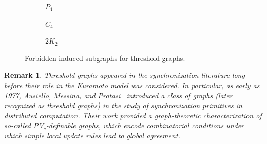 \documentclass[11pt,reqno]{amsart}
\newtheorem{remark}[theorem]{Remark}
\theoremstyle{definition}
\begin{document}
\begin{figure}[H]
  \centering

  \begin{subfigure}[b]{0.28\textwidth}
    \centering
    \caption{$P_4$}
  \end{subfigure}
  \hfill
  \begin{subfigure}[b]{0.28\textwidth}
    \centering
    \caption{$C_4$}
  \end{subfigure}
  \hfill
  \begin{subfigure}[b]{0.28\textwidth}
    \centering
    \caption{$2K_2$}
  \end{subfigure}
  \caption{Forbidden induced subgraphs for threshold graphs.}
  \label{fig:threshold-forbidden}
\end{figure}

\begin{remark}
Threshold graphs appeared in the synchronization literature long before their role in the Kuramoto model was considered. In particular, as early as 1977, Ausiello, Messina, and Protasi~\cite{Ausiello1977} introduced a class of graphs (later recognized as threshold graphs) in the study of synchronization primitives in distributed computation. Their work provided a graph-theoretic characterization of so-called PV$_c$-definable graphs, which encode combinatorial conditions under which simple local update rules lead to global agreement.
\end{remark}
\end{document}
